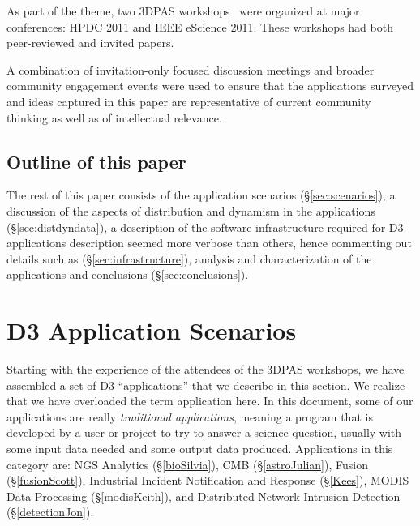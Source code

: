 \documentclass[times]{cpeauth}
\begin{document}
As part of the theme, two 3DPAS workshops~\cite{3dapas,D3-escience} were
organized at major conferences: HPDC 2011 and IEEE eScience 2011.  These
workshops had both peer-reviewed and invited papers.

A combination of invitation-only focused discussion meetings and broader
community engagement events were used to ensure that the applications surveyed
and ideas captured in this paper are representative of current community
thinking as well as of intellectual relevance.


\subsection{Outline of this paper}

The rest of this paper consists of the application scenarios
(\S\ref{sec:scenarios}), a discussion of the aspects of distribution and
dynamism in the applications (\S\ref{sec:distdyndata}), a description of the
software infrastructure required for D3 applications %
description seemed more verbose than others, hence commenting out details %
such as %
(\S\ref{sec:infrastructure}), analysis and characterization of the applications
and conclusions (\S\ref{sec:conclusions}).

\section{D3 Application Scenarios \label{sec:scenarios}}

Starting with the experience of the attendees of the 3DPAS workshops, we have
assembled a set of D3 ``applications'' that we describe in this section.  We
realize that we have overloaded the term application here.  In this document,
some of our applications are really {\em traditional applications}, meaning a
program that is developed by a user or project to try to answer a science
question, usually with some input data needed and some output data produced.
Applications in this category are: NGS Analytics (\S\ref{bioSilvia}), CMB
(\S\ref{astroJulian}), Fusion (\S\ref{fusionScott}), Industrial Incident
Notification and Response (\S\ref{Kees}), MODIS Data Processing
(\S\ref{modisKeith}), and Distributed Network Intrusion Detection
(\S\ref{detectionJon}).
\end{document}
